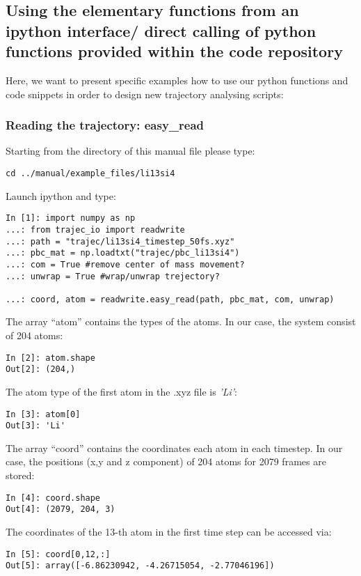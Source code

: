 \documentclass{article}
\begin{document}
\begin{itemize}
\subsection{Using the elementary functions from an ipython interface/ direct calling of python functions provided within the code repository}
%
%
%
%
%
%
%
%
%
Here, we want to present specific examples how to use our python functions and code snippets in order to design new trajectory analysing scripts:


\subsubsection{Reading the trajectory: easy\_read  }
Starting from the directory of this manual file please type:
\begin{verbatim}
cd ../manual/example_files/li13si4
\end{verbatim}
Launch ipython and type: 
\begin{verbatim}
In [1]: import numpy as np
...: from trajec_io import readwrite
...: path = "trajec/li13si4_timestep_50fs.xyz"
...: pbc_mat = np.loadtxt("trajec/pbc_li13si4")
...: com = True #remove center of mass movement?
...: unwrap = True #wrap/unwrap trejectory?

...: coord, atom = readwrite.easy_read(path, pbc_mat, com, unwrap)
\end{verbatim}
%
%
%
%
%
%
%
%
%
%
%
%


%
The array ``atom'' contains the types of the atoms. In our case, the system consist of 204 atoms: 
\begin{verbatim}
In [2]: atom.shape
Out[2]: (204,)
\end{verbatim}
The atom type of the first atom in the .xyz file is \textit{'Li'}:
\begin{verbatim}
In [3]: atom[0]
Out[3]: 'Li'
\end{verbatim}

The array ``coord'' contains the coordinates  each atom in each timestep. In our case, the positions (x,y and z component) of 204 atoms for  2079 frames  are stored:
\begin{verbatim}
In [4]: coord.shape
Out[4]: (2079, 204, 3)
\end{verbatim}

The coordinates of the 13-th atom in the first time step can be accessed via:
\begin{verbatim}
In [5]: coord[0,12,:]
Out[5]: array([-6.86230942, -4.26715054, -2.77046196])
\end{verbatim}


\end{itemize}
\end{document}
